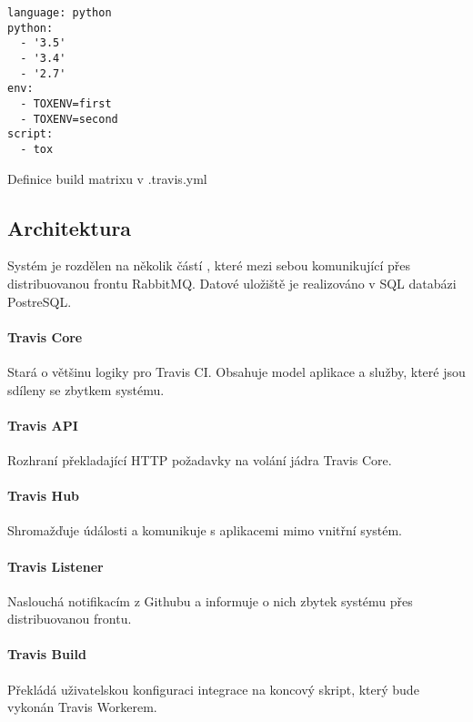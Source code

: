 \begin{listing}[ht]
\begin{verbatim}
language: python
python:
  - '3.5'
  - '3.4'
  - '2.7'
env:
  - TOXENV=first
  - TOXENV=second
script:
  - tox
\end{verbatim}
\caption{\label{code:travis-matrix}Definice build matrixu v .travis.yml}
\end{listing}

\subsection{Architektura}

Systém je rozdělen na několik částí \cite{travis_arch}, které mezi sebou komunikující přes distribuovanou frontu RabbitMQ.
Datové uložiště je realizováno v SQL databázi PostreSQL.

\paragraph{Travis Core}

Stará o většinu logiky pro Travis CI.
Obsahuje model aplikace a služby, které jsou sdíleny se zbytkem systému.

\paragraph{Travis API}

Rozhraní překladající HTTP požadavky na volání jádra Travis Core.

\paragraph{Travis Hub}

Shromažďuje údálosti a komunikuje s aplikacemi mimo vnitřní systém.

\paragraph{Travis Listener}

Naslouchá notifikacím z Githubu a informuje o nich zbytek systému přes distribuovanou frontu.

\paragraph{Travis Build}

Překládá uživatelskou konfiguraci integrace na koncový skript, který bude vykonán Travis Workerem.

